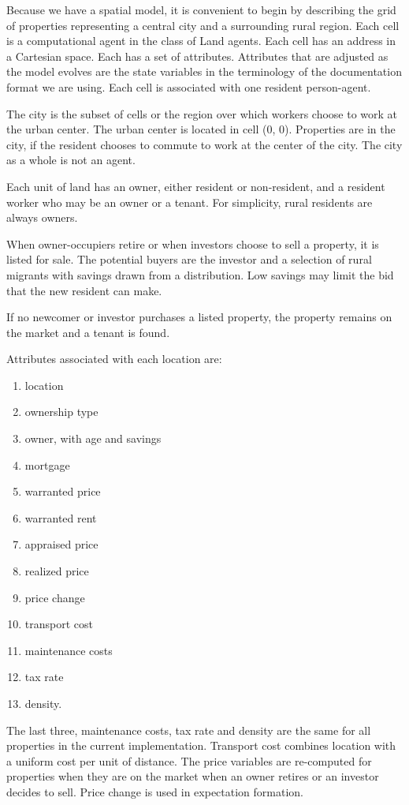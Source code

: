 Because we have a spatial model, it is convenient to begin by describing the grid of properties representing a central city and a surrounding rural region. Each cell is a computational agent in the class of Land agents. Each cell has an address in a Cartesian space. Each has a set of attributes. Attributes that are adjusted as the model evolves are the state variables in the terminology of the documentation format we are using. Each cell is associated with one resident person-agent. %

The city is the subset of cells or the region over which workers choose to work at the urban center. The urban center is located in cell (0, 0). Properties are in the city, if the resident chooses to commute to work at the center of the city.  The city as a whole is not an agent. 

Each unit of land has an owner, either resident or non-resident, and a resident worker who may be an owner or a tenant. For simplicity, rural residents are always owners.  

When owner-occupiers retire or when investors choose to sell a property, it is listed for sale. The potential buyers are the investor and a selection of rural migrants with savings drawn from a distribution.  Low savings may limit the bid that the new resident can make. 

If no newcomer or investor purchases a listed property, the property remains on the market and a tenant is found. 

Attributes associated with each location are:
\begin{enumerate}[topsep=8pt,itemsep=3pt,partopsep=4pt, parsep=4pt]%
    \item location
    \item ownership type 
    \item owner, with age and savings
    \item mortgage
    \item warranted price 
    \item warranted rent 
    \item appraised price 
    \item realized price
    \item price  change 
    \item transport cost 
    \item maintenance costs
    \item tax rate  
    \item density.  
\end{enumerate}
The last three,  maintenance costs, tax rate and density are the same for all properties in the current implementation. Transport cost combines location with a uniform cost per unit of distance.  The price variables are re-computed for properties when they are on the market when an owner retires or an investor decides to sell. Price change is used in expectation formation. %


